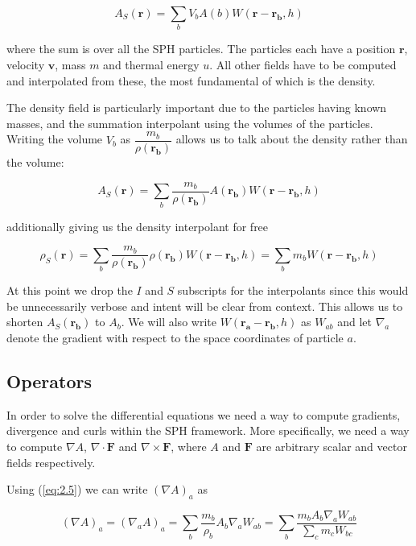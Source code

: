 \documentclass[../main.tex]{subfiles}
\begin{document}
\begin{equation}
    A_S(\bm{r}) = \sum_{b} V_b A(b) W(\bm{r} - \bm{r_b}, h)
\end{equation}

where the sum is over all the SPH particles. The particles each have a position $\bm{r}$, velocity $\bm{v}$, mass $m$ and thermal energy $u$. All other fields have to be computed and interpolated from these, the most fundamental of which is the density.

The density field is particularly important due to the particles having known masses, and the summation interpolant using the volumes of the particles. Writing the volume $V_b$ as $\dfrac{m_b}{\rho(\bm{r_b})}$ allows us to talk about the density rather than the volume:

\begin{equation} \label{eq:2.5}
    A_S(\bm{r}) = \sum_{b} \frac{m_b}{\rho(\bm{r_b})} A(\bm{r_b}) W(\bm{r} - \bm{r_b}, h)
\end{equation}

additionally giving us the density interpolant for free

\begin{equation}
    \rho_S(\bm{r}) = \sum_{b} \frac{m_b}{\rho(\bm{r_b})} \rho(\bm{r_b}) W(\bm{r} - \bm{r_b}, h) = \sum_{b} m_b W(\bm{r} - \bm{r_b}, h)
\end{equation}

At this point we drop the $I$ and $S$ subscripts for the interpolants since this would be unnecessarily verbose and intent will be clear from context. This allows us to shorten $A_S(\bm{r_b})$ to $A_b$. We will also write $W(\bm{r_a} - \bm{r_b}, h)$ as $W_{ab}$ and let $\nabla_a$ denote the gradient with respect to the space coordinates of particle $a$.

\subsection{Operators}
In order to solve the differential equations we need a way to compute gradients, divergence and curls within the SPH framework. More specifically, we need a way to compute $\nabla A$, $\nabla\cdot\bm{F}$ and $\nabla\times\bm{F}$, where $A$ and $\bm{F}$ are arbitrary scalar and vector fields respectively.

Using (\ref{eq:2.5}) we can write $(\nabla A)_a$ as

\begin{equation}
    (\nabla A)_a = (\nabla_a A)_a =
    \sum_b \frac{m_b}{\rho_b} A_b \nabla_a W_{ab} =
    \sum_b \frac{m_b A_b \nabla_a W_{ab}}{\sum_c m_c W_{bc}}
\end{equation}
\end{document}
